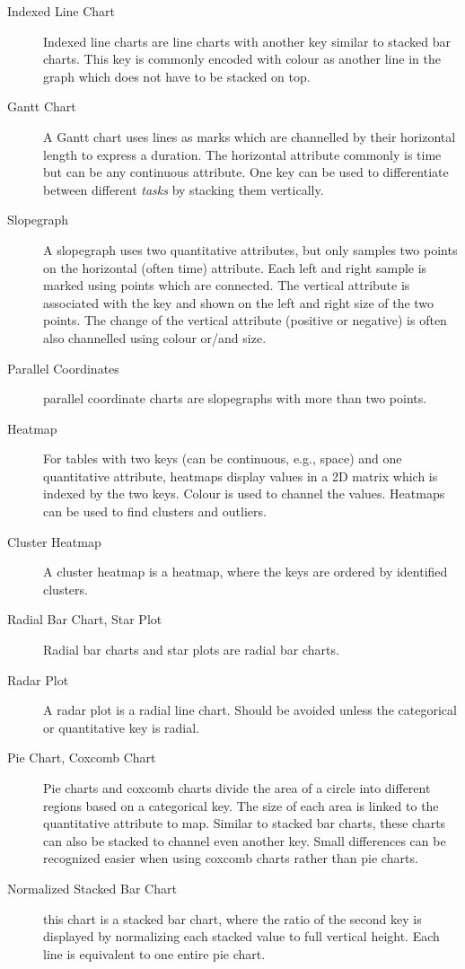 \begin{description}
    \item[Indexed Line Chart] Indexed line charts are line charts with another key similar to stacked bar charts.
        This key is commonly encoded with colour as another line in the graph which does not have to be stacked on top.

    \item[Gantt Chart] A Gantt chart uses lines as marks which are channelled by their horizontal length to express a duration.
        The horizontal attribute commonly is time but can be any continuous attribute.
        One key can be used to differentiate between different \emph{tasks} by stacking them vertically.

    \item[Slopegraph] A slopegraph uses two quantitative attributes, but only samples two points on the horizontal (often time) attribute.
        Each left and right sample is marked using points which are connected.
        The vertical attribute is associated with the key and shown on the left and right size of the two points.
        The change of the vertical attribute (positive or negative) is often also channelled using colour or/and size.

    \item[Parallel Coordinates] parallel coordinate charts are slopegraphs with more than two points.

    \item[Heatmap] For tables with two keys (can be continuous, e.g., space) and one quantitative attribute, heatmaps display values in a 2D matrix which is indexed by the two keys.
        Colour is used to channel the values.
        Heatmaps can be used to find clusters and outliers.

    \item[Cluster Heatmap] A cluster heatmap is a heatmap, where the keys are ordered by identified clusters.

    \item[Radial Bar Chart, Star Plot] Radial bar charts and star plots are radial bar charts.

    \item[Radar Plot] A radar plot is a radial line chart.
        Should be avoided unless the categorical or quantitative key is radial.

    \item[Pie Chart, Coxcomb Chart] Pie charts and coxcomb charts divide the area of a circle into different regions based on a categorical key.
        The size of each area is linked to the quantitative attribute to map.
        Similar to stacked bar charts, these charts can also be stacked to channel even another key.
        Small differences can be recognized easier when using coxcomb charts rather than pie charts.

    \item[Normalized Stacked Bar Chart] this chart is a stacked bar chart, where the ratio of the second key is displayed by normalizing each stacked value to full vertical height.
        Each line is equivalent to one entire pie chart.
\end{description}

